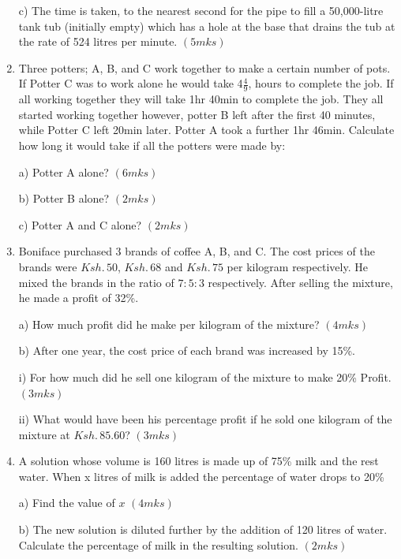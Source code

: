 \documentclass[
  letterpaper,
  DIV=11,
  numbers=noendperiod]{scrreprt}
\begin{document}
\begin{tcolorbox}
\begin{enumerate}
  c) The time is taken, to the nearest second for the pipe to fill a
  50,000-litre tank tub (initially empty) which has a hole at the base
  that drains the tub at the rate of 524 litres per minute.
  \hspace{13.5 cm} \((5mks)\)
\item
  Three potters; A, B, and C work together to make a certain number of
  pots. If Potter C was to work alone he would take 4\(\frac{4}{9}\),
  hours to complete the job. If all working together they will take 1hr
  40min to complete the job. They all started working together however,
  potter B left after the first 40 minutes, while Potter C left 20min
  later. Potter A took a further 1hr 46min. Calculate how long it would
  take if all the potters were made by:

  a) Potter A alone? \hspace{10.8 cm} \((6mks)\)

  b) Potter B alone? \hspace{10.8 cm} \((2mks)\)

  c) Potter A and C alone? \hspace{9.8 cm} \((2mks)\)
\item
  Boniface purchased 3 brands of coffee A, B, and C. The cost prices of
  the brands were \(Ksh.\, 50\), \(Ksh.\, 68\) and \(Ksh. \,75\) per
  kilogram respectively. He mixed the brands in the ratio of \(7:5:3\)
  respectively. After selling the mixture, he made a profit of 32\%.

  a) How much profit did he make per kilogram of the mixture?
  \hspace{4 cm} \((4mks)\)

  b) After one year, the cost price of each brand was increased by 15\%.

  i) For how much did he sell one kilogram of the mixture to make 20\%
  Profit.\hspace{1.3cm} \((3mks)\)

  ii) What would have been his percentage profit if he sold one kilogram
  of the mixture at \(Ksh. \,85.60\)? \hspace{10.6 cm} \((3mks)\)
\item
  A solution whose volume is 160 litres is made up of 75\% milk and the
  rest water. When x litres of milk is added the percentage of water
  drops to 20\%

  a) Find the value of \(x\) \hspace{10.4 cm} \((4mks)\)

  b) The new solution is diluted further by the addition of 120 litres
  of water. Calculate the percentage of milk in the resulting solution.
  \hspace{7.7 cm} \((2mks)\)


\end{enumerate}
\end{tcolorbox}
\end{document}
